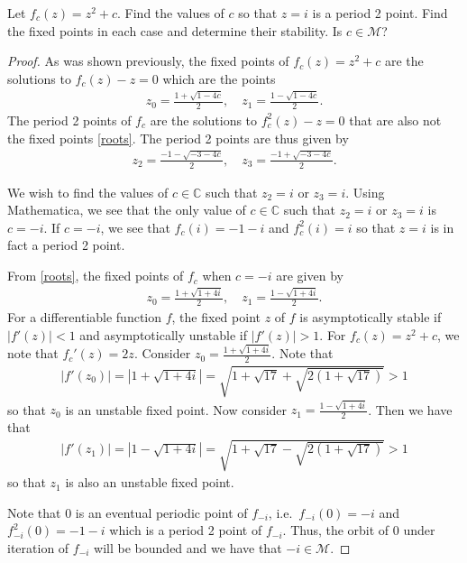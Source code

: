 \begin{problem}{3}
  Let $f_c(z) = z^2 + c$. Find the values of $c$ so that $z=i$ is a period 2 point.
  Find the fixed points in each case and determine their stability. Is $c \in \mathcal{M}$?
\end{problem}

\begin{proof}
  As was shown previously, the fixed points of
  $f_c(z) = z^2 + c$ are the solutions to $f_c(z) - z = 0$ which are the points
  \begin{align}\label{roots}
    z_0 = \frac{1 + \sqrt{1-4c}}{2}, \quad z_1 = \frac{1 - \sqrt{1-4c}}{2}.
  \end{align}
  The period 2 points of $f_c$ are the solutions to $f_c^2(z) - z = 0$ that are also not the fixed points \eqref{roots}.
  The period 2 points are thus given by
  \begin{align*}
    z_2 = \frac{-1 - \sqrt{-3 - 4 c}}{2}, \quad        z_3 = \frac{-1 + \sqrt{-3 - 4 c}}{2}.
  \end{align*}

  We wish to find the values of $c\in\mathbb{C}$ such that $z_2 = i$ or $z_3 = i$.
  Using Mathematica, we see that the only value of $c\in\mathbb{C}$ such that
  $z_2 = i$ or $z_3 = i$ is $c = -i$. If $c = -i$, we see that $f_c(i) = -1 - i$
  and $f_c^2(i) = i$ so that $z = i$ is in fact a period 2 point.

  From \eqref{roots}, the fixed points of $f_c$ when $c = -i$ are given by
  \begin{align*}
    z_0 = \frac{1 + \sqrt{1+4i}}{2}, \quad z_1 = \frac{1 - \sqrt{1+4i}}{2}.
  \end{align*}
  For a differentiable function $f$, the fixed point $z$ of $f$ is asymptotically stable
  if $|f'(z)| < 1$ and asymptotically unstable if $|f'(z)| > 1$. For $f_c(z) = z^2 + c$, we note that
  $f_c'(z) = 2z$. Consider $\displaystyle z_0 = \frac{1 + \sqrt{1+4i}}{2}$.
  Note that
  \begin{align*}
    |f'(z_0)| = \left|1+ \sqrt{1+4i}\right| = \sqrt{1 + \sqrt{17} + \sqrt{2(1 + \sqrt{17})}} > 1
  \end{align*}
  so that $z_0$ is an unstable fixed point. Now consider $\displaystyle z_1 = \frac{1 - \sqrt{1+4i}}{2}$.
  Then we have that
  \begin{align*}
    |f'(z_1)| = \left|1- \sqrt{1+4i}\right| = \sqrt{1 + \sqrt{17} - \sqrt{2(1 + \sqrt{17})}} > 1
  \end{align*}
  so that $z_1$ is also an unstable fixed point.

  Note that 0 is an eventual periodic point of $f_{-i}$, i.e.\
  $f_{-i}(0) = -i$ and $f^2_{-i}(0) = - 1 - i$ which is a period 2 point of $f_{-i}$. Thus,
  the orbit of 0 under iteration of $f_{-i}$ will be bounded and we have that $-i \in \mathcal{M}$.

\end{proof}
\newpage

